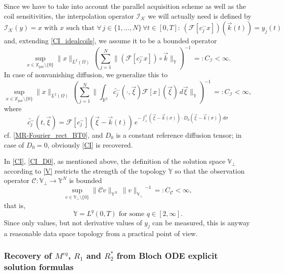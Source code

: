 \documentclass{ws-m3as}
\newcommand\Xpar{\mathbb{X}_{\text{par}}}
\newcommand\taup{\varepsilon}
\begin{document}
Since we have to take into account the parallel acquisition scheme as well as the coil sensitivities, the interpolation operator $\mathcal I_{\mathcal{K}}$ we will actually need is defined by 
\[
\mathcal I_{\mathcal{K}}(y)=x \text{ with }x\text{ such that }\forall\,j\in\{1,\ldots,N\}\,\forall t\in[0,T]: \  (\mathcal{F}[c^-_j x]) ({\vec k}(t))=y_j(t)
\]
and, extending \eqref{CI_idealcoils}, we assume it to be a bounded operator
\begin{equation}\label{CI}
\sup_{x\in\Xpar\setminus\{0\}} \|x\|_{L^2(\Omega)}\,\left(\sum_{j=1}^N\|(\mathcal{F}[c^-_j x])\circ{\vec k}\|_{\mathbb{Y}}\right)^{-1}\,=:C_{\mathcal{I}}<\infty.
\end{equation}
In case of nonvanishing diffusion, we generalize this to 
\begin{equation}\label{CI_D0}
\sup_{x\in\Xpar\setminus\{0\}} \|x\|_{L^2(\Omega)}\,\left(\sum_{j=1}^N\|\int_{\mathbb{R}^3}\widetilde{c^-_j}(\cdot,\vec\xi) \mathcal{F}[x](\vec\xi)\, d\vec\xi\|_{\mathbb{Y}}\right)^{-1}\,=:C_{\mathcal{I}}<\infty,
\end{equation}
where 
\[
\widetilde{c^-_j}(t,\vec\xi)
=\mathcal{F}[c_j^-](\vec\xi-\vec k(t))\,
e^{-\int_{\taup}^t(\vec\xi-\vec k(\sigma))\cdot D_0(\vec\xi-\vec k(\sigma))\, d\sigma}
\]
cf. \eqref{MR-Fourier_rect_BT0}, and $D_0$ is a constant reference diffusion tensor; in case of $D_0=0$, obviously \eqref{CI} is recovered.

In \eqref{CI}, \eqref{CI_D0}, as mentioned above, the definition of the solution space $\mathbb{V}_\perp$ according to \eqref{V} restricts the strength of the topology $\mathbb{Y}$ so that the observation operator $\mathcal{C}:\mathbb{V}_\perp\to\mathbb{Y}^{N}$ is bounded
\begin{equation}\label{CC}
\sup_{v\in\mathbb{V}_\perp\setminus\{0\}} \|\mathcal{C}v\|_{\mathbb{Y}^{N}}\,{\|v\|_{\mathbb{V}_\perp}}^{-1}\,=:C_{\mathcal{C}}<\infty, 
\end{equation}
that is, 
\begin{equation}\label{Y}
\mathbb{Y}= L^q(0,T)\text{ for some }q\in[2,\infty].
\end{equation} 
Since only values, but not derivative values of $y_j$ can be measured, this is anyway a reasonable data space topology from a practical point of view.


\subsubsection{Recovery of $M^{eq}$, $R_1$ and $R_2^*$ from Bloch ODE explicit solution formulas}\label{subsec:MRIex}
\end{document}
